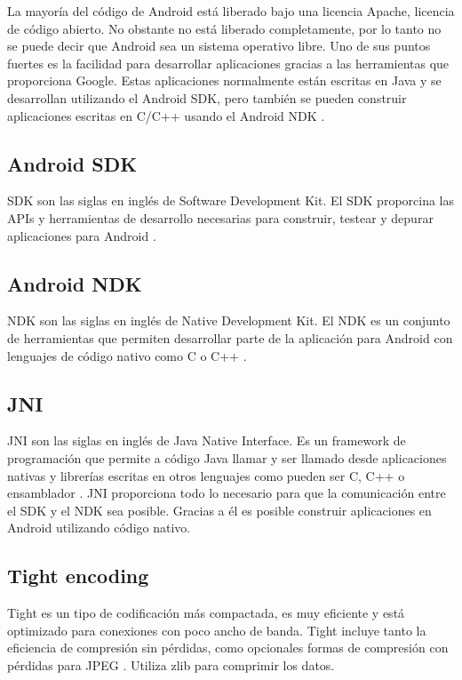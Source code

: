 La mayoría del código de Android está liberado bajo una licencia Apache, licencia de código abierto. No obstante no está liberado completamente, por lo tanto no se puede decir que Android sea un sistema operativo libre. Uno de sus puntos fuertes es la facilidad para desarrollar aplicaciones gracias a las herramientas que proporciona Google. Estas aplicaciones normalmente están escritas en Java y se desarrollan utilizando el Android SDK, pero también se pueden construir aplicaciones escritas en C/C++ usando el Android NDK \cite{wiki:Android}.

\subsection{Android SDK}

SDK son las siglas en inglés de Software Development Kit. El SDK proporcina las APIs y herramientas de desarrollo necesarias para construir, testear y depurar aplicaciones para Android \cite{SDK:SDK}.

\subsection{Android NDK}

NDK son las siglas en inglés de Native Development Kit. El NDK es un conjunto de herramientas que permiten desarrollar parte de la aplicación para Android con lenguajes de código nativo como C o C++ \cite{NDK:NDK}.

\subsection{JNI}

JNI son las siglas en inglés de Java Native Interface. Es un framework de programación que permite a código Java llamar y ser llamado desde aplicaciones nativas y librerías escritas en otros lenguajes como pueden ser C, C++ o ensamblador \cite{wiki:jni}. JNI proporciona todo lo necesario para que la comunicación entre el SDK y el NDK sea posible. Gracias a él es posible construir aplicaciones en Android utilizando código nativo.

\subsection{Tight encoding}

Tight es un tipo de codificación más compactada, es muy eficiente y está optimizado para conexiones con poco ancho de banda. Tight  incluye tanto la eficiencia de compresión sin pérdidas, como opcionales formas de compresión con pérdidas para JPEG \cite{tightpage:tight}. Utiliza zlib para comprimir los datos.

